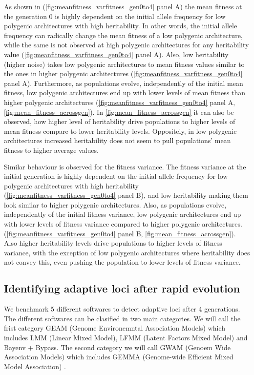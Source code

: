 \documentclass{article}
\begin{document}
As shown in (\ref{fig:meanfitness_varfitness_gen0to4} panel A) the mean fitness at the generation 0 is highly dependent on the initial allele frequency for low polygenic architectures with high heritability. In other words, the initial allele frequency can radically change the mean fitness of a low polygenic architecture, while the same is not observed at high polygenic architectures for any heritability value (\ref{fig:meanfitness_varfitness_gen0to4} panel A). Also, low heritability (higher noise) takes low polygenic architectures to mean fitness values similar to the ones in higher polygenic architectures (\ref{fig:meanfitness_varfitness_gen0to4} panel A). Furthermore, as populations evolve, independently of the initial mean fitness, low polygenic architectures end up with lower levels of mean fitness than higher polygenic architectures (\ref{fig:meanfitness_varfitness_gen0to4} panel A, \ref{fig:mean_fitness_acrossgen}). In \ref{fig:mean_fitness_acrossgen} it can also be observed, how higher level of heritability drive populations to higher levels of mean fitness compare to lower heritability levels. Oppositely, in low polygenic architectures increased heritability does not seem to pull populations' mean fitness to higher average values.

Similar behaviour is observed for the fitness variance. The fitness variance at the initial generation is highly dependent on the initial allele frequency for low polygenic architectures with high heritability (\ref{fig:meanfitness_varfitness_gen0to4} panel B), and low heritability making them look similar to higher polygenic architectures. Also, as populations evolve, independently of the initial fitness variance, low polygenic architectures end up with lower levels of fitness variance compared to higher polygenic architectures. (\ref{fig:meanfitness_varfitness_gen0to4} panel B, \ref{fig:mean_fitness_acrossgen}). Also higher heritability levels drive populations to higher levels of fitness variance, with the exception of low polygenic architectures where heritability does not convey this, even pushing the population to lower levels of fitness variance.

\subsection{Identifying adaptive loci after rapid evolution}
We benchmark 5 different softwares to detect adaptive loci after 4 generations. The different softwares can be clasified in two main categories. We will call the frist category GEAM (Genome Environemntal Association Models) which includes LMM (Linear Mixed Model), LFMM (Latent Factors Mixed Model) and Bayenv + Bypass. The second category we will call GWAM (Genoem Wide Association Models) which includes GEMMA (Genome-wide Efficient Mixed Model Association) \citep{Zhou2012-jb}. %
\end{document}
